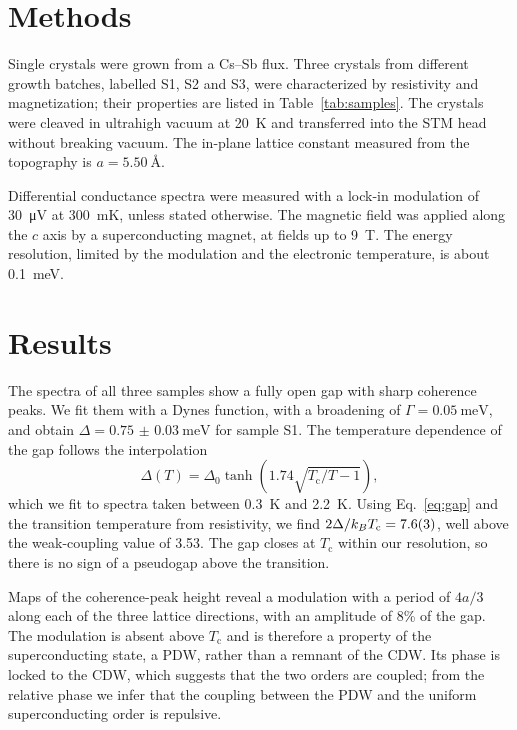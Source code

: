 \documentclass[aps,prl,twocolumn,superscriptaddress,showpacs]{revtex4-2}
\newcommand{\Tc}{T_\mathrm{c}}
\begin{document}
\section{Methods}

Single crystals were grown from a Cs--Sb flux. Three crystals from different growth batches, labelled S1, S2 and S3, were characterized by resistivity and magnetization; their properties are listed in Table~\ref{tab:samples}. The crystals were cleaved in ultrahigh vacuum at \SI{20}{\kelvin} and transferred into the STM head without breaking vacuum. The in-plane lattice constant measured from the topography is $a = \SI{5.50}{\angstrom}$.

Differential conductance spectra were measured with a lock-in modulation of \SI{30}{\micro\volt} at \SI{300}{\milli\kelvin}, unless stated otherwise. The magnetic field was applied along the $c$ axis by a superconducting magnet, at fields up to \SI{9}{\tesla}. The energy resolution, limited by the modulation and the electronic temperature, is about \SI{0.1}{\milli\electronvolt}.

\section{Results}

The spectra of all three samples show a fully open gap with sharp coherence peaks. We fit them with a Dynes function, with a broadening of $\Gamma = \SI{0.05}{\milli\electronvolt}$, and obtain $\Delta = \SI{0.75(3)}{\milli\electronvolt}$ for sample S1. The temperature dependence of the gap follows the interpolation
\begin{equation}
\Delta(T) = \Delta_0 \tanh\!\left(1.74\sqrt{\Tc/T - 1}\right),
\label{eq:gap}
\end{equation}
which we fit to spectra taken between \SI{0.3}{\kelvin} and \SI{2.2}{\kelvin}. Using Eq.~\eqref{eq:gap} and the transition temperature from resistivity, we find $2\Delta/k_B\Tc = \num{7.6 +- 0.3}$, well above the weak-coupling value of 3.53. The gap closes at $\Tc$ within our resolution, so there is no sign of a pseudogap above the transition.

Maps of the coherence-peak height reveal a modulation with a period of $4a/3$ along each of the three lattice directions, with an amplitude of 8\% of the gap. The modulation is absent above $\Tc$ and is therefore a property of the superconducting state, a PDW, rather than a remnant of the CDW. Its phase is locked to the CDW, which suggests that the two orders are coupled; from the relative phase we infer that the coupling between the PDW and the uniform superconducting order is repulsive.
\end{document}
